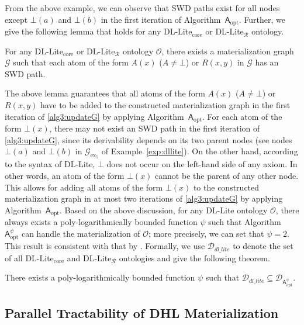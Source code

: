 From the above example, we can observe that SWD paths exist
for all nodes except $\bot(a)$ and $\bot(b)$ in the first iteration of Algorithm~$\mathsf{A}_{\text{opt}}$.
Further, we give the following lemma that holds for any DL-Lite$_{\text{core}}$ or DL-Lite$_\mathcal{R}$ ontology.

\begin{lemma}\label{lemma:dllite}
For any DL-Lite$_{\text{core}}$ or DL-Lite$_\mathcal{R}$ ontology $\mathcal{O}$, there exists a materialization graph $\mathcal{G}$ such that
each atom of the form $A(x)$ ($A\neq\bot$) or $R(x,y)$ in $\mathcal{G}$ has an SWD path.
\end{lemma}

The above lemma guarantees that all atoms of the form $A(x)$ ($A\neq\bot$) or $R(x,y)$
have to be added to the constructed materialization graph in the first iteration of
\ref{alg3:updateG} by applying Algorithm~$\mathsf{A}_{\text{opt}}$.
For each atom of the form $\bot(x)$, there may not exist an SWD path in the first iteration
of \ref{alg3:updateG}, since its derivability depends on its two parent nodes
(see nodes $\bot(a)$ and $\bot(b)$ in $\mathcal{G}_{\text{ex}_5}$ of
Example~\ref{exp:dllite}). On the other hand, according to the syntax of DL-Lite,
$\bot$ does not occur on the left-hand side of any axiom. In other words,
an atom of the form $\bot(x)$ cannot be the parent of any other node.
This allows for adding all atoms of the form $\bot(x)$ to the constructed materialization graph in at most two iterations of
\ref{alg3:updateG} by applying Algorithm~$\mathsf{A}_{\text{opt}}$.
Based on the above discussion, for any DL-Lite ontology $\mathcal{O}$,
there always exists a poly-logarithmically bounded function $\psi$ such that
Algorithm~$\mathsf{A}_{\text{opt}}^{\psi}$ can handle the materialization of $\mathcal{O}$;
more precisely, we can set that $\psi=2$. This result is consistent with
that by \citet{CalvaneseGLLR07}.
Formally, we use $\mathcal{D}_{\textit{dl\_lite}}$
to denote the set of all DL-Lite$_{\text{core}}$ and DL-Lite$_\mathcal{R}$ ontologies and give the following theorem.

\begin{theorem}\label{theorem:dl-lite}
There exists a poly-logarithmically bounded function $\psi$ such that
$\mathcal{D}_{\textit{dl\_lite}}\subseteq\mathcal{D}_{\mathsf{A}_{\text{opt}}^{\psi}}$.
\end{theorem}


\subsection{Parallel Tractability of  DHL Materialization}
\label{sec:DHL}

